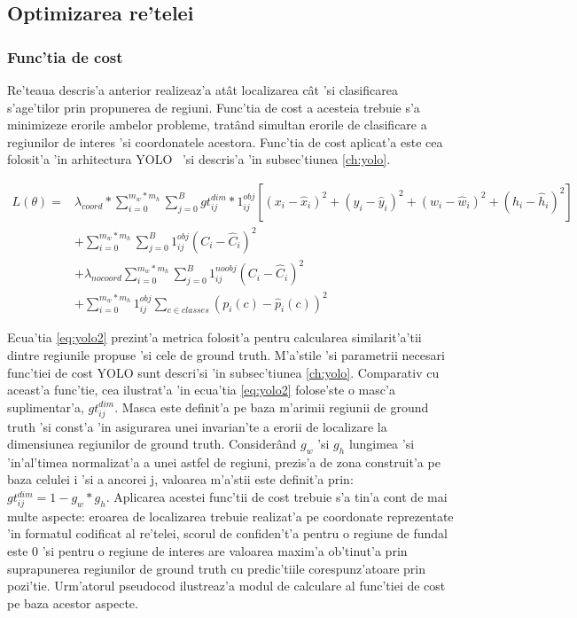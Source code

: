 \documentclass[12pt,a4paper,twoside]{report}
\begin{document}
\subsection{Optimizarea re'telei}
\subsubsection{Func'tia de cost}
Re'teaua descris'a anterior realizeaz'a at\^at localizarea c\^at 'si clasificarea s'age'tilor prin propunerea de regiuni. Func'tia de cost a acesteia trebuie s'a minimizeze erorile ambelor probleme, trat\^and simultan erorile de clasificare a regiunilor de interes 'si coordonatele acestora. Func'tia de cost aplicat'a este cea folosit'a 'in arhitectura YOLO~\cite{YOLO} 'si descris'a 'in subsec'tiunea \ref{ch:yolo}.

\begin{equation}
\begin{split}
L(\theta) = & \lambda_{coord} * \sum\limits_{i=0}^{m_w*m_h} \sum\limits_{j=0}^{B} gt_{ij}^{dim} * 1_{ij}^{obj}[(x_i - \hat{x}_i)^2 + (y_i - \hat{y}_i)^2 + (w_i - \hat{w}_i)^2 + (h_i - \hat{h}_i)^2] \\
& + \sum\limits_{i=0}^{m_w*m_h} \sum\limits_{j=0}^{B} 1_{ij}^{obj}(C_i - \hat{C}_i)^2\\
& + \lambda_{nocoord} \sum\limits_{i=0}^{m_w*m_h} \sum\limits_{j=0}^{B} 1_{ij}^{noobj}(C_i - \hat{C}_i)^2 \\
& + \sum\limits_{i=0}^{m_w*m_h} 1_{ij}^{obj} \sum\limits_{c \in classes} (p_i(c) - \hat{p}_i(c))^2
\end{split}
\label{eq:yolo2}
\end{equation}

Ecua'tia \ref{eq:yolo2} prezint'a metrica folosit'a pentru calcularea similarit'a'tii dintre regiunile propuse 'si cele de ground truth.  M'a'stile 'si parametrii necesari func'tiei de cost YOLO sunt descri'si 'in subsec'tiunea \ref{ch:yolo}. Comparativ cu aceast'a func'tie, cea ilustrat'a 'in  ecua'tia \ref{eq:yolo2} folose'ste o masc'a suplimentar'a, \textit{$gt_{ij}^{dim}$}. Masca este definit'a pe baza m'arimii regiunii de ground truth 'si const'a 'in asigurarea unei invarian'te a erorii de localizare la dimensiunea regiunilor de ground truth. Consider\^and $g_w$ 'si $g_h$ lungimea 'si 'in'al'timea normalizat'a a unei astfel de regiuni, prezis'a de zona construit'a pe baza celulei i 'si a ancorei j, valoarea m'a'stii este definit'a prin: $gt_{ij}^{dim} = 1 - g_w * g_h$. Aplicarea acestei func'tii de cost trebuie s'a tin'a cont de mai multe aspecte: eroarea de localizarea trebuie realizat'a pe coordonate reprezentate 'in formatul codificat al re'telei, scorul de confiden't'a pentru o regiune de fundal este 0 'si pentru o regiune de interes are valoarea maxim'a ob'tinut'a prin suprapunerea regiunilor de ground truth cu predic'tiile corespunz'atoare prin pozi'tie. Urm'atorul pseudocod ilustreaz'a modul de calculare al func'tiei de cost pe baza acestor aspecte.
\end{document}

